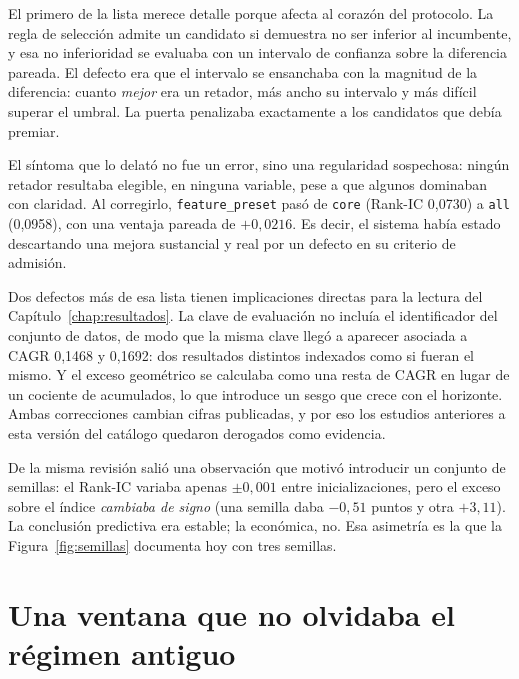 \begin{table}[H]
  \centering
  \footnotesize
  \caption{Defectos de validez detectados y efecto medido de su corrección.}
  \label{tab:defectos}
  
  \caption*{Fuente: , entrada de 2026-07-28.}
\end{table}

El primero de la lista merece detalle porque afecta al corazón del protocolo. La regla de selección
admite un candidato si demuestra no ser inferior al incumbente, y esa no inferioridad se evaluaba
con un intervalo de confianza sobre la diferencia pareada. El defecto era que el intervalo se
ensanchaba con la magnitud de la diferencia: cuanto \emph{mejor} era un retador, más ancho su
intervalo y más difícil superar el umbral. La puerta penalizaba exactamente a los candidatos que
debía premiar.

El síntoma que lo delató no fue un error, sino una regularidad sospechosa: ningún retador resultaba
elegible, en ninguna variable, pese a que algunos dominaban con claridad. Al corregirlo,
\texttt{feature\_preset} pasó de \texttt{core} (Rank-IC 0,0730) a \texttt{all} (0,0958), con una
ventaja pareada de $+0{,}0216$. Es decir, el sistema había estado descartando una mejora
sustancial y real por un defecto en su criterio de admisión.

Dos defectos más de esa lista tienen implicaciones directas para la lectura del
Capítulo~\ref{chap:resultados}. La clave de evaluación no incluía el identificador del conjunto de
datos, de modo que la misma clave llegó a aparecer asociada a CAGR 0,1468 y 0,1692: dos resultados
distintos indexados como si fueran el mismo. Y el exceso geométrico se calculaba como una resta de
CAGR en lugar de un cociente de acumulados, lo que introduce un sesgo que crece con el horizonte.
Ambas correcciones cambian cifras publicadas, y por eso los estudios anteriores a esta versión del
catálogo quedaron derogados como evidencia.

De la misma revisión salió una observación que motivó introducir un conjunto de semillas: el Rank-IC
variaba apenas $\pm 0{,}001$ entre inicializaciones, pero el exceso sobre el índice \emph{cambiaba
de signo} (una semilla daba $-0{,}51$ puntos y otra $+3{,}11$). La conclusión predictiva era
estable; la económica, no. Esa asimetría es la que la Figura~\ref{fig:semillas} documenta hoy con
tres semillas.

\section{Una ventana que no olvidaba el régimen antiguo}

